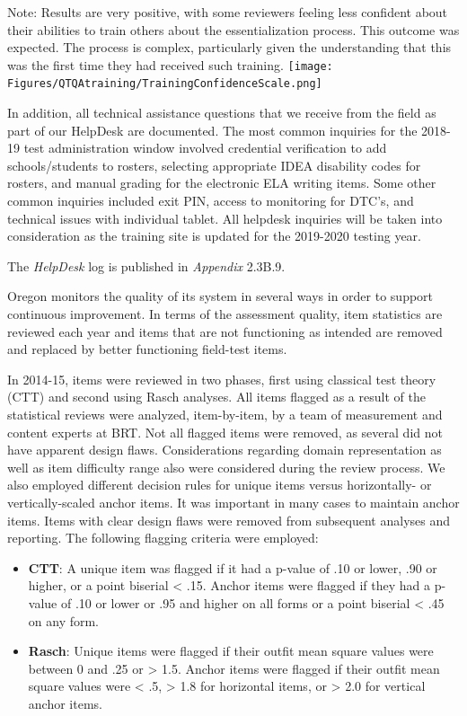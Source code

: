 \documentclass[]{article}
\providecommand{\tightlist}{%
  \setlength{\itemsep}{0pt}\setlength{\parskip}{0pt}}
\begin{document}
Note: Results are very positive, with some reviewers feeling less
confident about their abilities to train others about the
essentialization process. This outcome was expected. The process is
complex, particularly given the understanding that this was the first
time they had received such training. \FloatBarrier
\texttt{[image: Figures/QTQAtraining/TrainingConfidenceScale.png]}

In addition, all technical assistance questions that we receive from the
field as part of our HelpDesk are documented. The most common inquiries
for the 2018-19 test administration window involved credential
verification to add schools/students to rosters, selecting appropriate
IDEA disability codes for rosters, and manual grading for the electronic
ELA writing items. Some other common inquiries included exit PIN, access
to monitoring for DTC's, and technical issues with individual tablet.
All helpdesk inquiries will be taken into consideration as the training
site is updated for the 2019-2020 testing year.

The \emph{HelpDesk} log is published in \emph{Appendix} 2.3B.9.

Oregon monitors the quality of its system in several ways in order to
support continuous improvement. In terms of the assessment quality, item
statistics are reviewed each year and items that are not functioning as
intended are removed and replaced by better functioning field-test
items.

In 2014-15, items were reviewed in two phases, first using classical
test theory (CTT) and second using Rasch analyses. All items flagged as
a result of the statistical reviews were analyzed, item-by-item, by a
team of measurement and content experts at BRT. Not all flagged items
were removed, as several did not have apparent design flaws.
Considerations regarding domain representation as well as item
difficulty range also were considered during the review process. We also
employed different decision rules for unique items versus horizontally-
or vertically-scaled anchor items. It was important in many cases to
maintain anchor items. Items with clear design flaws were removed from
subsequent analyses and reporting. The following flagging criteria were
employed:

\begin{itemize}
\tightlist
\item
  \textbf{CTT}: A unique item was flagged if it had a p-value of .10 or
  lower, .90 or higher, or a point biserial \textless{} .15. Anchor
  items were flagged if they had a p-value of .10 or lower or .95 and
  higher on all forms or a point biserial \textless{} .45 on any form.
\item
  \textbf{Rasch}: Unique items were flagged if their outfit mean square
  values were between 0 and .25 or \textgreater{} 1.5. Anchor items were
  flagged if their outfit mean square values were \textless{} .5,
  \textgreater{} 1.8 for horizontal items, or \textgreater{} 2.0 for
  vertical anchor items.
\end{itemize}
\end{document}
